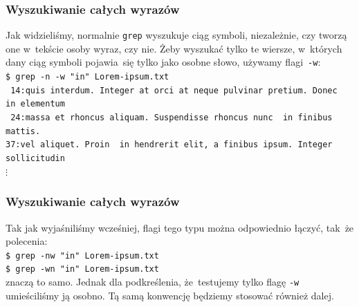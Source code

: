 \documentclass[10pt,t]{beamer}
\begin{document}
\begin{frame}
  \frametitle{Wyszukiwanie całych wyrazów}


  Jak widzieliśmy, normalnie \texttt{grep} wyszukuje ciąg symboli,
  niezależnie, czy tworzą one w~tekście osoby wyraz, czy nie. Żeby
  wyszukać tylko te wiersze, w~których dany ciąg symboli pojawia~się
  tylko jako osobne słowo, używamy flagi~\texttt{-w}: \\
  \texttt{\$ grep -n -w "in"{} Lorem-ipsum.txt} \\
  \texttt{{\color{green} 14:}quis interdum. Integer at orci at neque
    pulvinar pretium. Donec {\color{red} in} elementum} \\
  \texttt{{\color{green} 24:}massa et rhoncus aliquam. Suspendisse rhoncus
    nunc {\color{red} in} finibus mattis.} \\
  \texttt{{\color{green}37:}vel aliquet. Proin {\color{red} in} hendrerit
    elit, a finibus ipsum. Integer sollicitudin} \\
  \hspace{1em} $\vdots$ \\


\end{frame}





\begin{frame}
  \frametitle{Wyszukiwanie całych wyrazów}


  Tak jak wyjaśniliśmy wcześniej, flagi tego typu można odpowiednio łączyć,
  tak~że polecenia: \\
  \texttt{\$ grep -nw "in"{} Lorem-ipsum.txt} \\
  \texttt{\$ grep -wn "in"{} Lorem-ipsum.txt} \\
  znaczą to samo. Jednak dla podkreślenia, że~testujemy tylko flagę
  \texttt{-w} umieściliśmy ją osobno. Tą samą konwencję będziemy stosować
  również dalej.

\end{frame}
\end{document}
